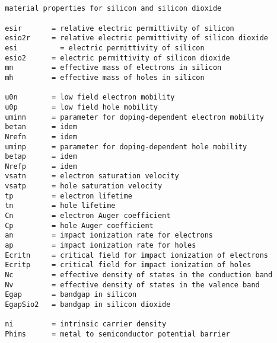 \begin{verbatim}


 material properties for silicon and silicon dioxide

 esir       = relative electric permittivity of silicon
 esio2r     = relative electric permittivity of silicon dioxide
 esi 	      = electric permittivity of silicon
 esio2      = electric permittivity of silicon dioxide
 mn         = effective mass of electrons in silicon
 mh         = effective mass of holes in silicon
 
 u0n        = low field electron mobility
 u0p        = low field hole mobility
 uminn      = parameter for doping-dependent electron mobility
 betan      = idem
 Nrefn      = idem
 uminp      = parameter for doping-dependent hole mobility
 betap      = idem
 Nrefp      = idem
 vsatn      = electron saturation velocity
 vsatp      = hole saturation velocity
 tp         = electron lifetime
 tn         = hole lifetime
 Cn         = electron Auger coefficient
 Cp         = hole Auger coefficient
 an         = impact ionization rate for electrons
 ap         = impact ionization rate for holes
 Ecritn     = critical field for impact ionization of electrons
 Ecritp     = critical field for impact ionization of holes 
 Nc         = effective density of states in the conduction band
 Nv         = effective density of states in the valence band
 Egap       = bandgap in silicon
 EgapSio2   = bandgap in silicon dioxide
 
 ni         = intrinsic carrier density
 Phims      = metal to semiconductor potential barrier


\end{verbatim}

\clearpage
